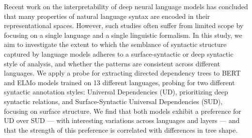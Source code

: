 Recent work on the interpretability of deep neural language models has concluded that many properties of natural language syntax are encoded in their representational spaces. However, such studies often suffer from limited scope by focusing on a single language and a single linguistic formalism. In this study, we aim to investigate the extent to which the semblance of syntactic structure captured by language models adheres to a surface-syntactic or deep syntactic style of analysis, and whether the patterns are consistent across different languages. We apply a probe for extracting directed dependency trees to BERT and ELMo models trained on 13 different languages, probing for two different syntactic annotation styles: Universal Dependencies (UD), prioritizing deep syntactic relations, and Surface-Syntactic Universal Dependencies (SUD), focusing on surface structure. We find that both models exhibit a preference for UD over SUD --- with interesting variations across languages and layers --- and that the strength of this preference is correlated with differences in tree shape.
